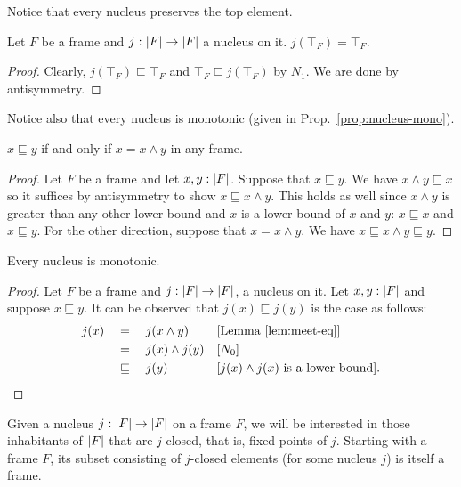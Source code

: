 Notice that every nucleus preserves the top element.
\begin{prop}\label{prop:nucleus-resp-top}
  Let $F$ be a frame and $j\hspace{0.1mm}:\hspace{0.1mm}\left| F \right| \rightarrow \left| F \right|$ a nucleus on it.
  $j(\top_F) = \top_F$.
\end{prop}
\begin{proof}
  Clearly, $j(\top_F) \sqsubseteq \top_F$ and $\top_F \sqsubseteq j(\top_F)$ by $N_1$. We are done by antisymmetry.
\end{proof}

Notice also that every nucleus is monotonic (given in Prop.~\ref{prop:nucleus-mono}).

\begin{lemma}\label{lem:meet-eq}
  $x \sqsubseteq y$ if and only if $x = x \wedge y$ in any frame.
\end{lemma}
\begin{proof}
  Let $F$ be a frame and let $x, y:\left| F \right|$. Suppose that $x \sqsubseteq y$. We have $x \wedge
  y \sqsubseteq x$ so it suffices by antisymmetry to show $x \sqsubseteq x \wedge y$. This holds as well since $x \wedge
  y$ is greater than any other lower bound and $x$ is a lower bound of $x$ and $y$: $x \sqsubseteq
  x$ and $x \sqsubseteq y$. For the other direction, suppose that $x = x \wedge y$. We have $x \sqsubseteq x \wedge y \sqsubseteq
  y$.
\end{proof}

\begin{prop}\label{prop:nucleus-mono}
  Every nucleus is monotonic.
\end{prop}
\begin{proof}
  Let $F$ be a frame and $j : \left| F \right| \rightarrow \left| F \right|$, a nucleus on it. Let
  $x, y:\left| F \right|$ and suppose $x \sqsubseteq y$. It can be observed that $j(x) \sqsubseteq j(y)$ is
  the case as follows:
  \begin{align*}
    j(x) &\quad=\quad j(x \wedge y)        && [\text{Lemma~\ref{lem:meet-eq}}]               \\
         &\quad=\quad j(x) \wedge j(y)     && [N_0]                                          \\
         &\quad\sqsubseteq\quad {j(y)}                && [\text{$j(x) \wedge j(x)$ is a lower bound}]  .
  \end{align*}
\end{proof}

Given a nucleus $j\hspace{0.1mm}:\hspace{0.1mm}\left| F \right| \rightarrow \left| F \right|$ on a frame $F$, we will be interested in
those inhabitants of $\left| F \right|$ that are $j$-closed, that is, fixed points of $j$. Starting
with a frame $F$, its subset consisting of $j$-closed elements (for some nucleus $j$) is
itself a frame.

